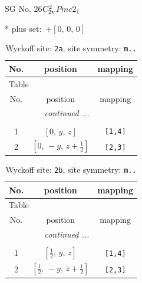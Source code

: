 \documentclass[fleqn,8pt]{jsarticle}
\begin{document}
\setcounter{MaxMatrixCols}{32}

\renewcommand{\tablename}{Table~}
\renewcommand{\figurename}{Figure~}
\begin{center}
\LARGE
SG No. 26\quad$C_{\rm 2v}^{2}$\quad$Pmc2_1$\quad[ orthorhombic ]
\end{center}
* plus set:\,\,\,$+\left[ 0,\, 0,\, 0 \right]$
\renewcommand{\arraystretch}{1.2}
\begin{longtable}{ccc}
\caption{Wyckoff site: {\tt 2a}, site symmetry: {\tt m..}}
 \\
 \hline \hline
No. & position & mapping \\ \hline \endfirsthead

\multicolumn{2}{l}{\tablename\ \thetable{}} \\
 \hline \hline
No. & position & mapping \\ \hline \endhead

 \hline \hline
\multicolumn{2}{r}{\footnotesize\it continued ...} \\ \endfoot

 \hline \hline
\multicolumn{2}{r}{} \\ \endlastfoot

1 & $\left[ 0,\, y,\, z \right]$ & {\tt [1,4]} \\ \hline
2 & $\left[ 0,\, - y,\, z + \frac{1}{2} \right]$ & {\tt [2,3]} \\
\end{longtable}
\renewcommand{\arraystretch}{1.2}
\begin{longtable}{ccc}
\caption{Wyckoff site: {\tt 2b}, site symmetry: {\tt m..}}
 \\
 \hline \hline
No. & position & mapping \\ \hline \endfirsthead

\multicolumn{2}{l}{\tablename\ \thetable{}} \\
 \hline \hline
No. & position & mapping \\ \hline \endhead

 \hline \hline
\multicolumn{2}{r}{\footnotesize\it continued ...} \\ \endfoot

 \hline \hline
\multicolumn{2}{r}{} \\ \endlastfoot

1 & $\left[ \frac{1}{2},\, y,\, z \right]$ & {\tt [1,4]} \\ \hline
2 & $\left[ \frac{1}{2},\, - y,\, z + \frac{1}{2} \right]$ & {\tt [2,3]} \\
\end{longtable}
\end{document}

